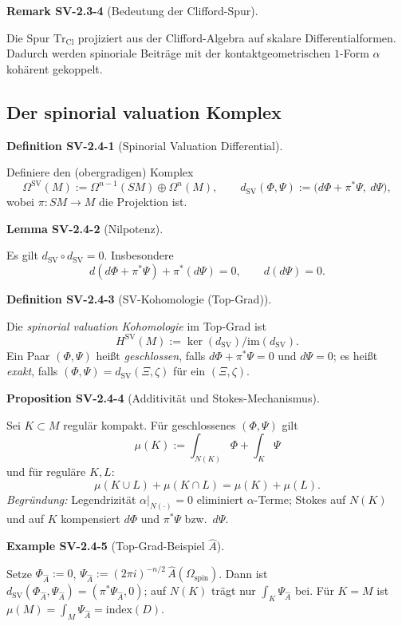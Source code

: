 \documentclass[10pt, letterpaper]{article}
\newcommand{\CustomHeading}[3]{%
  \par\medskip\noindent%
  \textbf{#1 #2} \textnormal{(#3)}.\enskip%
}
\newenvironment{DEF}[2]{\begin{unitbox}\CustomHeading{Definition}{#1}{#2}}{\end{unitbox}}
\newenvironment{PROP}[2]{\begin{unitbox}\CustomHeading{Proposition}{#1}{#2}}{\end{unitbox}}
\newenvironment{LEM}[2]{\begin{unitbox}\CustomHeading{Lemma}{#1}{#2}}{\end{unitbox}}
\newenvironment{REM}[2]{\begin{unitbox}\CustomHeading{Remark}{#1}{#2}}{\end{unitbox}}
\newenvironment{EXA}[2]{\begin{unitbox}\CustomHeading{Example}{#1}{#2}}{\end{unitbox}}
\begin{document}
\begin{REM}{SV-2.3-4}{Bedeutung der Clifford-Spur}
Die Spur $\mathrm{Tr}_{\mathrm{Cl}}$ projiziert aus der Clifford-Algebra auf skalare Differentialformen. Dadurch werden spinoriale Beiträge mit der kontaktgeometrischen $1$-Form $\alpha$ kohärent gekoppelt.
\end{REM}


\subsection{Der spinorial valuation Komplex}\label{subsec:SV-2.4}

\begin{DEF}{SV-2.4-1}{Spinorial Valuation Differential}
Definiere den (obergradigen) Komplex
\[
\Omega^{\operatorname{SV}}(M):=\Omega^{n-1}(SM)\oplus \Omega^{n}(M),\qquad
d_{\operatorname{SV}}(\Phi,\Psi):=\big(d\Phi+\pi^*\Psi,\ d\Psi\big),
\]
wobei $\pi:SM\to M$ die Projektion ist.
\end{DEF}

\begin{LEM}{SV-2.4-2}{Nilpotenz}
Es gilt $d_{\operatorname{SV}}\circ d_{\operatorname{SV}}=0$. Insbesondere
\[
d(d\Phi+\pi^*\Psi)+\pi^*(d\Psi)=0,\qquad d(d\Psi)=0.
\]
\end{LEM}

\begin{DEF}{SV-2.4-3}{SV-Kohomologie (Top-Grad)}
Die \emph{spinorial valuation Kohomologie} im Top-Grad ist
\[
H^{\operatorname{SV}}(M):=\ker(d_{\operatorname{SV}})/\mathrm{im}(d_{\operatorname{SV}}).
\]
Ein Paar $(\Phi,\Psi)$ heißt \emph{geschlossen}, falls $d\Phi+\pi^*\Psi=0$ und $d\Psi=0$; es heißt \emph{exakt}, falls $(\Phi,\Psi)=d_{\operatorname{SV}}(\Xi,\zeta)$ für ein $(\Xi,\zeta)$.
\end{DEF}

\begin{PROP}{SV-2.4-4}{Additivität und Stokes-Mechanismus}
Sei $K\subset M$ regulär kompakt. Für geschlossenes $(\Phi,\Psi)$ gilt
\[
\mu(K):=\int_{N(K)}\Phi+\int_K\Psi
\]
und für reguläre $K,L$:
\[
\mu(K\cup L)+\mu(K\cap L)=\mu(K)+\mu(L).
\]
\emph{Begründung:} Legendrizität $\alpha|_{N(\cdot)}=0$ eliminiert $\alpha$-Terme; Stokes auf $N(K)$ und auf $K$ kompensiert $d\Phi$ und $\pi^*\Psi$ bzw.\ $d\Psi$.
\end{PROP}

\begin{EXA}{SV-2.4-5}{Top-Grad-Beispiel $\widehat A$}
Setze $\Phi_{\widehat A}:=0$, $\Psi_{\widehat A}:=(2\pi i)^{-n/2}\,\widehat A(\Omega_{\mathrm{spin}})$. Dann ist $d_{\operatorname{SV}}(\Phi_{\widehat A},\Psi_{\widehat A})=(\pi^*\Psi_{\widehat A},0)$; auf $N(K)$ trägt nur $\int_K\Psi_{\widehat A}$ bei. Für $K=M$ ist $\mu(M)=\int_M\Psi_{\widehat A}=\mathrm{index}(D)$.
\end{EXA}
\end{document}
